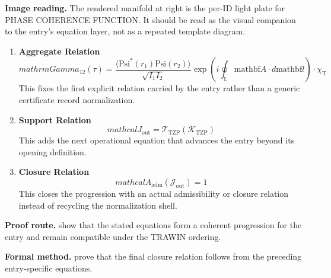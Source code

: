 \begin{samepage}
\noindent\begin{minipage}[t]{0.45\linewidth}
\vspace{0pt}
\raggedright
\scriptsize\textbf{Image reading.} The rendered manifold at right is the per-ID light plate for PHASE COHERENCE FUNCTION. It should be read as the visual companion to the entry's equation layer, not as a repeated template diagram.\par
\end{minipage}\hfill
\begin{minipage}[t]{0.53\linewidth}
\vspace*{-0.10in}
\raggedright
{}
\end{minipage}
\end{samepage}

\clearpage


\begin{enumerate}[leftmargin=1.6em,itemsep=9pt,topsep=6pt]
\item \textbf{Aggregate Relation}
\[
mathrm{Gamma}_{12}(\tau) = \frac{\langle \mathrm{Psi}^*(r_1)\mathrm{Psi}(r_2) \rangle}{\sqrt{I_1 I_2}} \exp\left( i \oint_{\mathrm{L}} \mathrm{mathbf}{A} \cdot d\mathrm{mathbf}{l} \right) \cdot \chi_{\mathrm{T}}
\]
This fixes the first explicit relation carried by the entry rather than a generic certificate record normalization.

\item \textbf{Support Relation}
\[
mathcal{J}_{\mathrm{out}} = \mathcal{T}_{\mathrm{TZP}}\!\left(\mathcal{K}_{\mathrm{TZP}}\right)
\]
This adds the next operational equation that advances the entry beyond its opening definition.

\item \textbf{Closure Relation}
\[
mathcal{A}_{\mathrm{adm}}\!\left(\mathcal{J}_{\mathrm{out}}\right)=1
\]
This closes the progression with an actual admissibility or closure relation instead of recycling the normalization shell.
\end{enumerate}

\textbf{Proof route.} show that the stated equations form a coherent progression for the entry and remain compatible under the TRAWIN ordering.

\textbf{Formal method.} prove that the final closure relation follows from the preceding entry-specific equations.


